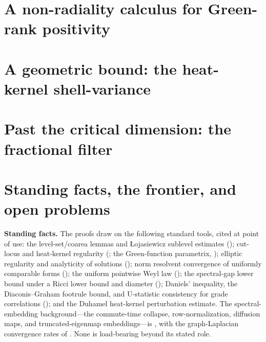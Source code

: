 \documentclass[11pt]{article}
\theoremstyle{remark}
\begin{document}
\section{A non-radiality calculus for Green-rank positivity}\label{sec:positivity}


\section{A geometric bound: the heat-kernel shell-variance}\label{sec:l2}


\section{Past the critical dimension: the fractional filter}\label{sec:fractional}


\section{Standing facts, the frontier, and open problems}\label{sec:frontier}

\noindent\textbf{Standing facts.} The proofs draw on the following standard tools, cited at
point of use: the level-set/coarea lemmas and \L ojasiewicz sublevel estimates
(\cite{evansgariepy,vddries,vddriesmiller,bierstonemilman,comtelionrolin}); cut-locus and
heat-kernel regularity (\cite{sakai,minpleijel}; the Green-function parametrix,
\cite{aubin,gilkey,seeley}); elliptic regularity and analyticity of solutions
(\cite{gilbargtrudinger,morreynirenberg}); norm resolvent convergence of uniformly comparable
forms (\cite{kato}); the uniform pointwise Weyl law (\cite{hormander}); the spectral-gap lower
bound under a Ricci lower bound and diameter (\cite{liyau,zhongyang}); Daniels' inequality,
the Diaconis--Graham footrule bound, and U-statistic consistency for grade correlations
(\cite{daniels,diaconisgraham,hoeffding}); and the Duhamel heat-kernel perturbation estimate.
The spectral-embedding background---the commute-time collapse, row-normalization, diffusion
maps, and truncated-eigenmap embeddings---is \cite{vonluxburg,njw,coifmanlafon,berard,bates,portegies},
with the graph-Laplacian convergence rates of \cite{calder,gtslepcev}. None is load-bearing
beyond its stated role.
\end{document}
